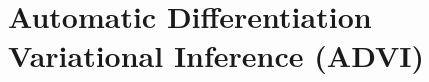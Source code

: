 \documentclass[10pt]{beamer}
\newcommand{\bbvi}{\,\texttt{bbvi}\,}
\begin{document}
%
%
%
% 
%
%


\section{Automatic Differentiation Variational Inference (ADVI)}
\end{document}
